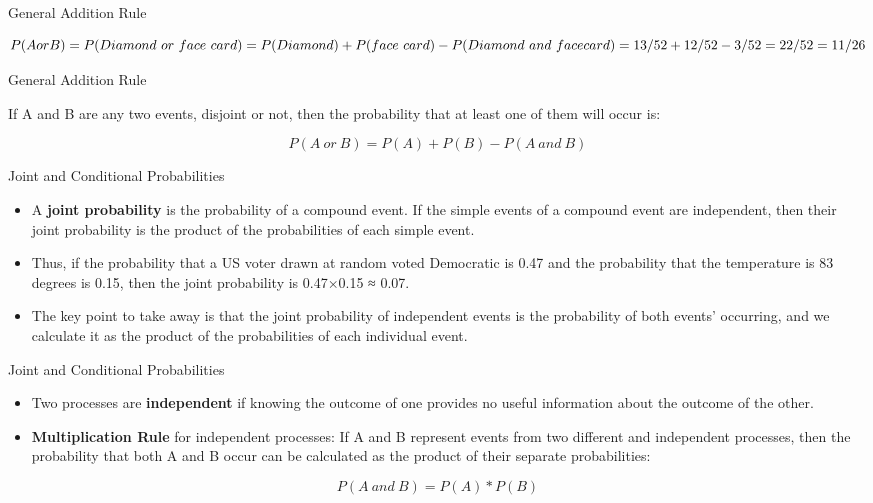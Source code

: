 \documentclass[
  ignorenonframetext,
]{beamer}
\begin{document}
\begin{frame}{General Addition Rule}
\protect\hypertarget{general-addition-rule-2}{}

\[P(AorB) = P (Diamond \ or \ face \ card) = \\
P (Diamond) + P (face \ card) -  P (Diamond \ and \ face card) = \\ 13/52 + 12/52 -  3/52 = \\
22/52 = \\ 
11/26\]

\end{frame}

\begin{frame}{General Addition Rule}
\protect\hypertarget{general-addition-rule-3}{}

If A and B are any two events, disjoint or not, then the probability
that at least one of them will occur is:

\[P(A \ or \ B)=P(A)+P(B)−P(A\ and \ B)\]

\end{frame}

\begin{frame}{Joint and Conditional Probabilities}
\protect\hypertarget{joint-and-conditional-probabilities}{}

\begin{itemize}
\item
  A \textbf{joint probability} is the probability of a compound event.
  If the simple events of a compound event are independent, then their
  joint probability is the product of the probabilities of each simple
  event.
\item
  Thus, if the probability that a US voter drawn at random voted
  Democratic is 0.47 and the probability that the temperature is 83
  degrees is 0.15, then the joint probability is 0.47×0.15 ≈ 0.07.
\item
  The key point to take away is that the joint probability of
  independent events is the probability of both events' occurring, and
  we calculate it as the product of the probabilities of each individual
  event.
\end{itemize}

\end{frame}

\begin{frame}{Joint and Conditional Probabilities}
\protect\hypertarget{joint-and-conditional-probabilities-1}{}

\begin{itemize}
\item
  Two processes are \textbf{independent} if knowing the outcome of one
  provides no useful information about the outcome of the other.
\item
  \textbf{Multiplication Rule} for independent processes: If A and B
  represent events from two different and independent processes, then
  the probability that both A and B occur can be calculated as the
  product of their separate probabilities:
\end{itemize}

\[P(A \ and \ B)=P(A)*P(B)\]

\end{frame}
\end{document}

